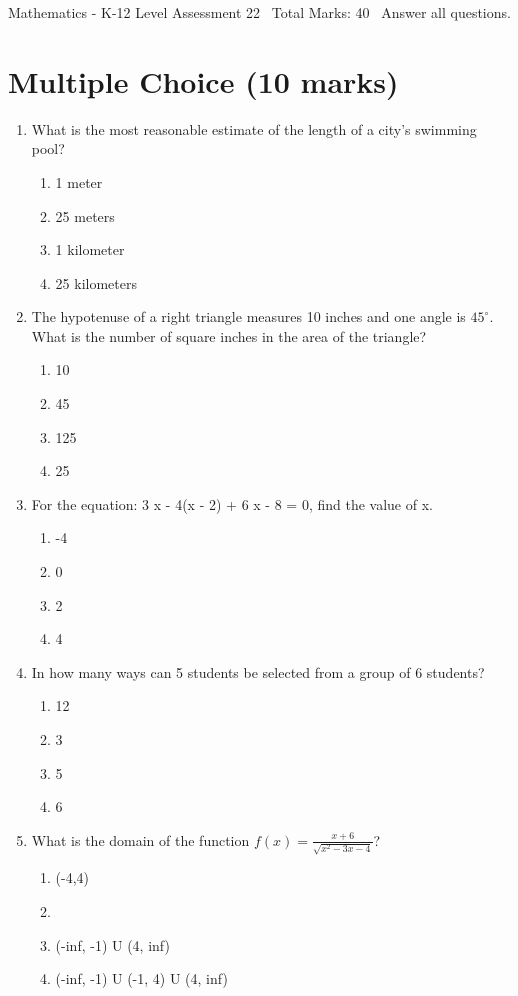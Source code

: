 \documentclass[12pt]{article}
\begin{document}
\begin{center}
Mathematics - K-12 Level Assessment 22 \
Total Marks: 40 \
Answer all questions.
\end{center}

\section*{Multiple Choice (10 marks)}
\begin{enumerate}[label=\arabic*.]
\item What is the most reasonable estimate of the length of a city's swimming pool?
\begin{enumerate}[label=(\alph*)]
    \item 1 meter
    \item 25 meters
    \item 1 kilometer
    \item 25 kilometers
\end{enumerate}
\item The hypotenuse of a right triangle measures 10 inches and one angle is $45^{\circ}$. What is the number of square inches in the area of the triangle?
\begin{enumerate}[label=(\alph*)]
    \item 10
    \item 45
    \item 125
    \item 25
\end{enumerate}
\item For the equation: 3 x - 4(x - 2) + 6 x - 8 = 0, find the value of x.
\begin{enumerate}[label=(\alph*)]
    \item -4
    \item 0
    \item 2
    \item 4
\end{enumerate}
\item In how many ways can 5 students be selected from a group of 6 students?
\begin{enumerate}[label=(\alph*)]
    \item 12
    \item 3
    \item 5
    \item 6
\end{enumerate}
\item What is the domain of the function $f(x)=\frac{x+6}{\sqrt{x^2-3 x-4}}$?
\begin{enumerate}[label=(\alph*)]
    \item (-4,4)
    \item [0,4]
    \item (-inf, -1) U (4, inf)
    \item (-inf, -1) U (-1, 4) U (4, inf)
\end{enumerate}
\end{enumerate}
\end{document}
